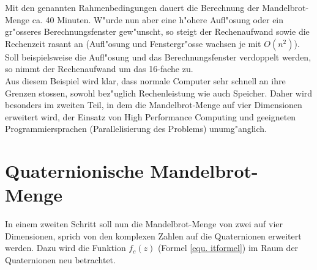 \begin{refsection}
\begin{itemize}
		\end{itemize}
		Mit den genannten Rahmenbedingungen dauert die Berechnung der Mandelbrot-Menge ca. 40 Minuten. W"urde nun aber eine h"ohere Aufl"osung oder ein gr"osseres Berechnungsfenster gew"unscht, so steigt der Rechenaufwand sowie die Rechenzeit rasant an (Aufl"osung und Fenstergr"osse wachsen je mit $O(n^2)$). Soll beispielsweise die Aufl"osung und das Berechnungsfenster verdoppelt werden, so nimmt der Rechenaufwand um das 16-fache zu.\\[0.3cm]
		Aus diesem Beispiel wird klar, dass normale Computer sehr schnell an ihre Grenzen stossen, sowohl bez"uglich Rechenleistung wie auch Speicher. Daher wird besonders im zweiten Teil, in dem die Mandelbrot-Menge auf vier Dimensionen erweitert wird, der Einsatz von High Performance Computing und geeigneten Programmiersprachen (Parallelisierung des Problems) unumg"anglich. 		
	
\section{Quaternionische Mandelbrot-Menge}
		In einem zweiten Schritt soll nun die Mandelbrot-Menge von zwei auf vier Dimensionen, sprich von den komplexen Zahlen auf die Quaternionen erweitert werden. Dazu wird die Funktion $f_c(z)$ (Formel \ref{equ. itformel}) im Raum der Quaternionen neu betrachtet.
		

\end{refsection}
